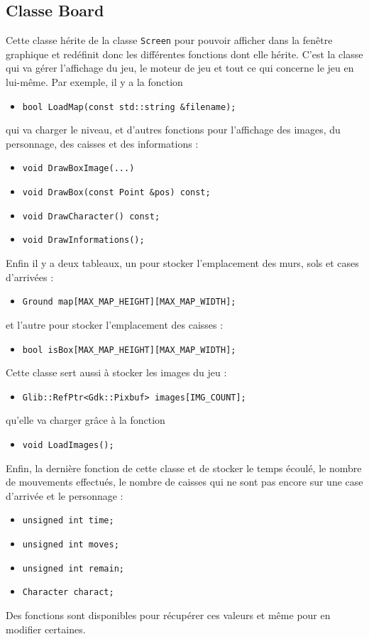 \documentclass[a4paper,11pt,oneside]{article}
\begin{document}
\subsection{Classe Board}
Cette classe hérite de la classe \verb|Screen| pour pouvoir afficher dans la fenêtre graphique et redéfinit donc les différentes fonctions
dont elle hérite. C'est la classe qui va gérer l'affichage du jeu, le moteur de jeu et tout ce qui concerne le jeu en lui-même.
Par exemple, il y a la fonction
\begin{itemize}
\item\verb|bool LoadMap(const std::string &filename);|
\end{itemize}
qui va charger le niveau, et d'autres fonctions pour l'affichage des images, du personnage, des caisses et des informations :
\begin{itemize}
\item\verb|void DrawBoxImage(...)|
\item\verb|void DrawBox(const Point &pos) const;|
\item\verb|void DrawCharacter() const;|
\item\verb|void DrawInformations();|
\end{itemize}
Enfin il y a deux tableaux, un pour stocker l'emplacement des murs, sols et cases d'arrivées :
\begin{itemize}
\item\verb|Ground map[MAX_MAP_HEIGHT][MAX_MAP_WIDTH];|
\end{itemize}
et l'autre pour stocker l'emplacement des caisses :
\begin{itemize}
\item\verb|bool isBox[MAX_MAP_HEIGHT][MAX_MAP_WIDTH];|
\end{itemize}
Cette classe sert aussi à stocker les images du jeu :
\begin{itemize}
\item\verb|Glib::RefPtr<Gdk::Pixbuf> images[IMG_COUNT];|
\end{itemize}
qu'elle va charger grâce à la fonction
\begin{itemize}
\item\verb|void LoadImages();|
\end{itemize}
Enfin, la dernière fonction de cette classe et de stocker le temps écoulé, le nombre de mouvements effectués, le nombre de caisses
qui ne sont pas encore sur une case d'arrivée et le personnage :
\begin{itemize}
\item\verb|unsigned int time;|
\item\verb|unsigned int moves;|
\item\verb|unsigned int remain;|
\item\verb|Character charact;|
\end{itemize}
Des fonctions sont disponibles pour récupérer ces valeurs et même pour en modifier certaines.
\end{document}
